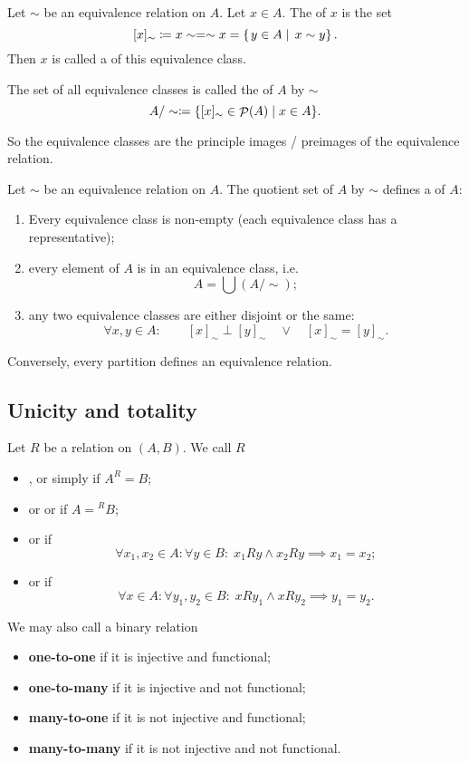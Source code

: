 \begin{definition}
Let $\sim$ be an equivalence relation on $A$. Let $x\in A$. The  of $x$ is the set
\[ [x]_\sim \coloneqq x\sim = \sim x = \left\{\left. y\in A \;\right|\; x\sim y \right\}. \]
Then $x$ is called a  of this equivalence class.

The set of all equivalence classes is called the  of $A$ by $\sim$
\[ A/\sim \coloneqq \{ [x]_\sim \in \mathop{\mathcal{P}}(A) \;|\; x\in A \}. \]
\end{definition}
So the equivalence classes are the principle images / preimages of the equivalence relation.

\begin{proposition}
Let $\sim$ be an equivalence relation on $A$. The quotient set of $A$ by $\sim$ defines a  of $A$:
\begin{enumerate}
\item Every equivalence class is non-empty (each equivalence class has a representative);
\item every element of $A$ is in an equivalence class, i.e.
\[ A = \bigcup (A/\sim); \]
\item any two equivalence classes are either disjoint or the same:
\[ \forall x,y\in A: \qquad[x]_\sim \perp [y]_\sim \quad \lor \quad [x]_\sim = [y]_\sim. \]
\end{enumerate}
Conversely, every partition defines an equivalence relation.
\end{proposition}

\subsection{Unicity and totality}
\begin{definition}
Let $R$ be a relation on $(A, B)$. We call $R$
\begin{itemize}
\item {},  or simply  if $A^R = B$;
\item {} or  or  if $A = {^RB}$;
\item {} or  if
\[ \forall x_1,x_2\in A: \forall y\in B: \; x_1Ry \land x_2Ry \implies x_1=x_2; \]
\item {} or  if
\[ \forall x\in A: \forall y_1,y_2\in B: \; xRy_1 \land xRy_2 \implies y_1=y_2. \]
\end{itemize}
We may also call a binary relation
\begin{itemize}
\item \textbf{one-to-one} if it is injective and functional;
\item \textbf{one-to-many} if it is injective and not functional;
\item \textbf{many-to-one} if it is not injective and functional;
\item \textbf{many-to-many} if it is not injective and not functional.
\end{itemize}
\end{definition}

